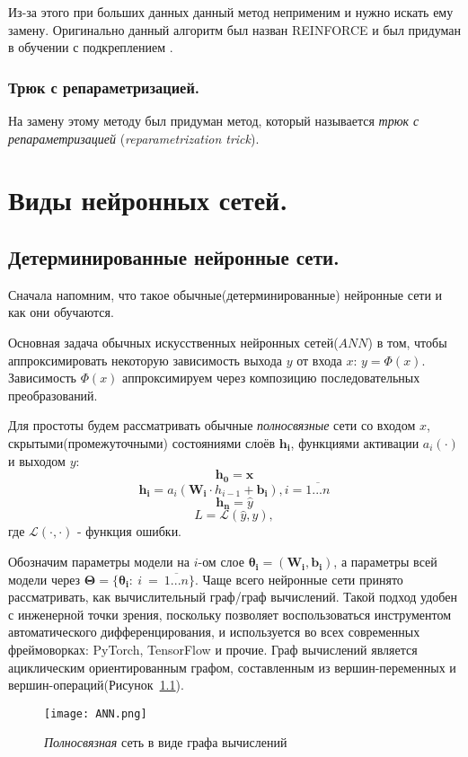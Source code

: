  Из-за этого при больших данных данный метод неприменим и нужно искать ему замену. Оригинально данный алгоритм был назван REINFORCE и был придуман
 в обучении с подкреплением \cite{williams:92}.

\subsection{Трюк с репараметризацией.}

На замену этому методу был придуман метод, который называется \textit{трюк с репараметризацией} (\textit{reparametrization trick})\cite{auto-encod-bayes}.

\chapter{Виды нейронных сетей.}

\section{Детерминированные нейронные сети.}

Сначала напомним, что такое обычные(детерминированные) нейронные сети и как они обучаются.

Основная задача обычных искусственных нейронных сетей($ANN$) в том, чтобы аппроксимировать некоторую зависимость выхода $y$ от
 входа $x$: $y = \Phi(x)$. Зависимость $\Phi(x)$ аппроксимируем через композицию последовательных преобразований.

Для простоты будем рассматривать обычные \textit{полносвязные} сети со входом $x$,
 скрытыми(промежуточными) состояниями слоёв $\bm{h_i}$, функциями активации $a_i(\cdot)$ и выходом $y$:
$$\bm{h_0} = \bm{x}$$
$$\bm{h_i} = a_i(\bm{W_i} \cdot h_{i-1} + \bm{b_i}), i = \overline{1...n}$$
$$\bm{h_n} = \widehat{y}$$
$$L = \mathcal{L}(\widehat{y}, y),$$ где $\mathcal{L}(\cdot, \cdot)$ - функция ошибки.

Обозначим параметры модели на $i$-ом слое $\bm{\theta_i} = (\bm{W_i}, \bm{b_i})$, а параметры всей модели через $\bm{\Theta} = \{\bm{\theta_i} :~i~=~\overline{1...n}\}$.
Чаще всего нейронные сети принято рассматривать, как вычислительный граф/граф вычислений.
 Такой подход удобен с инженерной точки зрения, поскольку позволяет воспользоваться инструментом автоматического
 дифференцирования, и используется во всех современных фреймоворках: PyTorch, TensorFlow и прочие.
 Граф вычислений является ациклическим ориентированным графом, составленным из вершин-переменных и вершин-операций(Рисунок~\ref{fig:ANN}).
\begin{figure}[H]
    \centering
    \texttt{[image: ANN.png]}
    \caption{\textit{Полносвязная} сеть в виде графа вычислений}
    \label{fig:ANN}
\end{figure}

